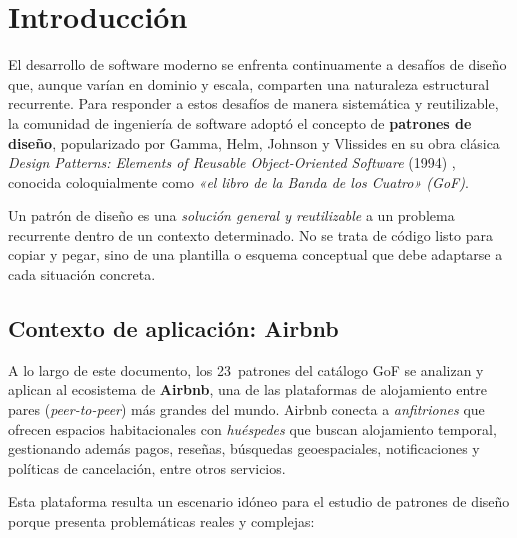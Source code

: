 
\chapter*{Introducción}

\setcounter{page}{1}

El desarrollo de software moderno se enfrenta continuamente a desafíos de diseño que,
aunque varían en dominio y escala, comparten una naturaleza estructural recurrente.
Para responder a estos desafíos de manera sistemática y reutilizable, la comunidad de
ingeniería de software adoptó el concepto de \textbf{patrones de diseño}, popularizado
por Gamma, Helm, Johnson y Vlissides en su obra clásica \textit{Design Patterns: Elements
of Reusable Object-Oriented Software} (1994) \cite{GoF1994}, conocida coloquialmente como
\textit{«el libro de la Banda de los Cuatro» (GoF)}.

Un patrón de diseño es una \emph{solución general y reutilizable} a un problema
recurrente dentro de un contexto determinado. No se trata de código listo para
copiar y pegar, sino de una plantilla o esquema conceptual que debe adaptarse a
cada situación concreta.

\section*{Contexto de aplicación: Airbnb}

A lo largo de este documento, los 23~patrones del catálogo GoF se analizan y aplican
al ecosistema de \textbf{Airbnb}, una de las plataformas de alojamiento entre pares
(\textit{peer-to-peer}) más grandes del mundo. Airbnb conecta a \emph{anfitriones}
que ofrecen espacios habitacionales con \emph{huéspedes} que buscan alojamiento
temporal, gestionando además pagos, reseñas, búsquedas geoespaciales, notificaciones
y políticas de cancelación, entre otros servicios.

Esta plataforma resulta un escenario idóneo para el estudio de patrones de diseño
porque presenta problemáticas reales y complejas:

